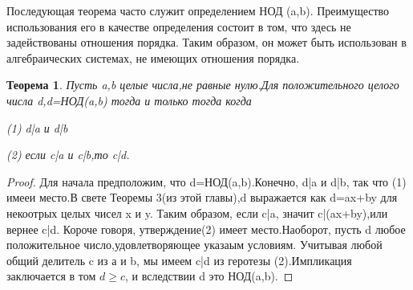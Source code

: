 \documentclass[11pt]{article}
\newtheorem{theorem}{Теорема}
\begin{document}
Последующая теорема часто служит определением НОД (a,b). Преимущество использования его в качестве определения состоит в том, что здесь не задействованы отношения порядка. Таким образом, он может быть использован в алгебраических системах, не имеющих отношения порядка. 

\begin{theorem}
	Пусть a,b целые числа,не равные нулю.Для положительного целого числа d,d=НОД(a,b) тогда и только тогда когда
	\begin{flushleft}
		(1) d|a и d|b
	\end{flushleft}
	\begin{flushleft}
	(2) если c|a и c|b,то c|d.
	\end{flushleft}
\end{theorem}
\begin{proof}
	Для начала предположим, что d=НОД(a,b).Конечно, d|a и d|b, так что (1) имееи место.В свете Теоремы 3(из этой главы),d выражается как d=ax+by для некоотрых целых чисел x и y.
	Таким образом, если c|a, значит c|(ax+by),или вернее c|d.
	Короче говоря, утверждение(2) имеет место.Наоборот, пусть d любое положительное число,удовлетворяющее указаым условиям.
	Учитывая любой общий делитель c из а и b, мы имеем c|d из геротезы (2).Импликация заключается в том $d \ge c$, и  вследствии d это НОД(a,b).
\end{proof}
\end{document}
